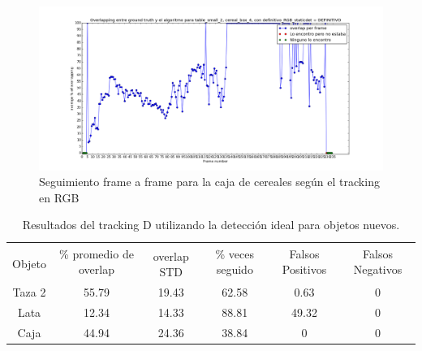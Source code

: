 \begin{figure}
	\centering
	\includegraphics[width=\textwidth]{img/seguimientoframeaframe-rgb-nuevo-caja.png}
	\caption{Seguimiento frame a frame para la caja de cereales según el tracking en RGB}
	\label{frame_frame_rgb_nuevo}
\end{figure}



\begin{table}
    \begin{tabular}{|c|c|c|c|c|c|}
    \hline
    & \multirow{2}{2.4cm}{\% promedio de overlap} & & \multirow{2}{2cm}{\% veces seguido} & \multirow{2}{1.6cm}{Falsos Positivos} & \multirow{2}{1.6cm}{Falsos Negativos}\\
	Objeto & & overlap STD & & &\\
    \hline
    Taza 2  & 55.79      & 19.43       & 62.58             & 0.63             & 0\\
    \hline
    Lata    & 12.34      & 14.33       & 88.81             & 49.32            & 0\\
    \hline
    Caja    & 44.94      & 24.36       & 38.84             & 0                & 0\\
    \hline
    \end{tabular}
\caption{Resultados del tracking D utilizando la detección ideal para objetos nuevos.}
\label{tabla_d_nuevos}
\end{table}

